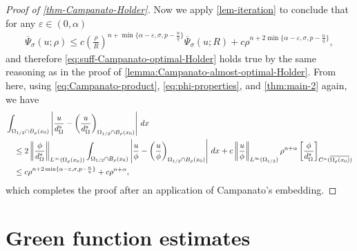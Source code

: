 \documentclass[11pt,reqno]{amsart}
\theoremstyle{plain}
\theoremstyle{definition}
\numberwithin{equation}{section}
\newcommand{\eps}{\varepsilon}
\newcommand{\1}{\mathbbm{1}}
\renewcommand{\d}{\textnormal{\,d}}
\begin{document}
\begin{proof}[Proof of \autoref{thm-Campanato-Holder}]
Now we apply \autoref{lem-iteration} to conclude that for any $\eps \in (0,\alpha)$
\begin{align*}
\overline{\Psi}_\sigma(u; \rho) \leq c \left( \frac{\rho}{R} \right)^{n+ \min\{\alpha - \eps , \sigma , p - \frac{n}{q}\}} \overline{\Psi}_\sigma(u; R) + c \rho^{n + 2 \min\{\alpha - \eps,\sigma,p - \frac{n}{q}\}},
\end{align*}
and therefore \eqref{eq:suff-Campanato-optimal-Holder} holds true by the same reasoning as in the proof of \autoref{lemma:Campanato-almost-optimal-Holder}. From here, using \eqref{eq:Campanato-product}, \eqref{eq:phi-properties}, and \autoref{thm:main-2} again, we have
\begin{align*}
& \int_{\Omega_{1/2} \cap B_\rho(x_0)} \left| \frac{u}{d^s_{\Omega}} - \left( \frac{u}{d^s_{\Omega}} \right)_{\Omega_{1/2} \cap B_{\rho}(x_0)} \right| \d x \\
&\quad \le 2 \left \Vert \frac{\phi}{d^s_{\Omega}} \right\Vert_{L^{\infty}(\Omega_{\rho}(x_0))} \int_{\Omega_{1/2} \cap B_\rho(x_0)} \left| \frac{u}{\phi} - \left( \frac{u}{\phi} \right)_{\Omega_{1/2}\cap B_\rho(x_0)} \right| \d x + c\left \Vert \frac{u}{\phi} \right\Vert_{L^{\infty}(\Omega_{1/2})} \rho^{n+\alpha} \left[ \frac{\phi}{d^s_{\Omega}} \right]_{C^{\alpha}(\overline{\Omega_{\rho}(x_0)})} \\
&\quad\le c \rho^{n + 2 \min\{ \alpha - \eps,\sigma,p - \frac{n}{q} \} } + c\rho^{n+\alpha},
\end{align*}
which completes the proof after an application of Campanato's embedding.
\end{proof}














\section{Green function estimates}
\label{sec:Green}
\end{document}
